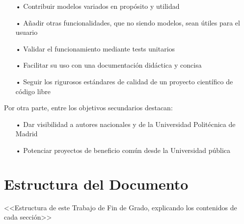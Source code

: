 \begin{itemize}

    \item[•] Contribuir modelos variados en propósito y utilidad

    \item[•] Añadir otras funcionalidades, que no siendo modelos, sean útiles para el usuario

    \item[•] Validar el funcionamiento mediante tests unitarios

    \item[•] Facilitar su uso con una documentación didáctica y concisa

    \item[•] Seguir los rigurosos estándares de calidad de un proyecto científico de código libre

\end{itemize}

Por otra parte, entre los objetivos secundarios destacan:

\begin{itemize}

    \item [•] Dar visibilidad a autores nacionales y de la Universidad Politécnica de Madrid
    
    \item [•] Potenciar proyectos de beneficio común desde la Universidad pública

\end{itemize}


\section{Estructura del Documento} \label{sct:intro_estructura}

<<Estructura de este Trabajo de Fin de Grado, explicando los contenidos de cada sección>>

